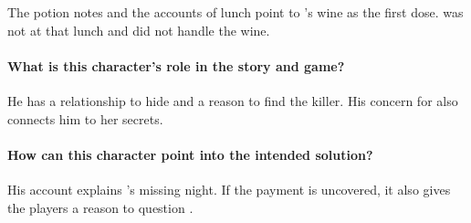 {{The potion notes and the accounts of lunch point to 's wine as the first dose.  was not at that lunch and did not handle the wine.

\paragraph{What is this character's role in the story and game?}

He has a relationship to hide and a reason to find the killer. His concern for  also connects him to her secrets.

\paragraph{How can this character point into the intended solution?}

His account explains 's missing night. If the payment is uncovered, it also gives the players a reason to question .

}

}
